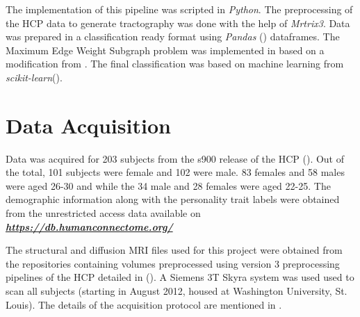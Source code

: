 \documentclass[msthesis.tex]{subfiles}
\begin{document}
The implementation of this pipeline was scripted in \textit{Python}. The preprocessing of the HCP data to generate tractography was done with the help of \textit{Mrtrix3}.  Data was prepared in a classification ready format using \textit{Pandas} (\cite{pandas_2020}) dataframes. The Maximum Edge Weight Subgraph problem was implemented in  based on a modification from \cite{DBLP:journals/corr/LobodaAS16}. The final classification was based on machine learning from \textit{scikit-learn}(\cite{sklearn_2012}). 

\section{Data Acquisition}
\label{sec:acquisition}
Data was acquired for 203 subjects from the s900 release of the HCP (\cite{hcp2015wu}). Out of the total, 101 subjects were female and 102 were male. 83 females and 58 males were aged 26-30 and while the 34 male and 28 females were aged 22-25. The demographic information along with the personality trait labels were obtained from the unrestricted access data available on \href{https://db.humanconnectome.org/}{\textbf{\textit{https://db.humanconnectome.org/}}}


The structural and diffusion MRI files used for this project were obtained from the repositories containing volumes preprocessed using version 3 preprocessing pipelines of the HCP detailed in (\cite{GLASSER2013105}). A Siemens 3T Skyra system was used used to scan all subjects (starting in August 2012, housed at Washington University, St. Louis). The details of the acquisition protocol are mentioned in \cite{van2012human}.
\end{document}
